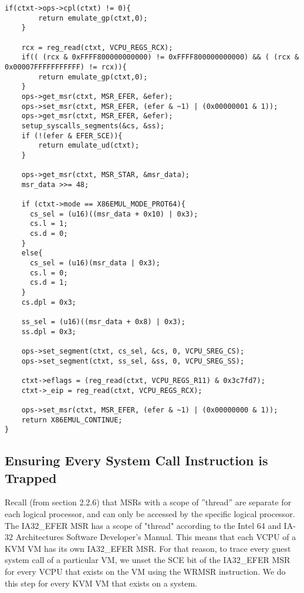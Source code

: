 \documentclass{report}
\begin{document}
\begin{spacing}{1.5}
\begin{lstlisting}[caption={Emulation of SYSRET instruction},captionpos=b]
    if(ctxt->ops->cpl(ctxt) != 0){
        return emulate_gp(ctxt,0);
    }
    
    rcx = reg_read(ctxt, VCPU_REGS_RCX);
    if(( (rcx & 0xFFFF800000000000) != 0xFFFF800000000000) && ( (rcx & 0x00007FFFFFFFFFFF) != rcx)){
        return emulate_gp(ctxt,0);
    }
    ops->get_msr(ctxt, MSR_EFER, &efer);
    ops->set_msr(ctxt, MSR_EFER, (efer & ~1) | (0x00000001 & 1));
    ops->get_msr(ctxt, MSR_EFER, &efer);
    setup_syscalls_segments(&cs, &ss);
    if (!(efer & EFER_SCE)){
        return emulate_ud(ctxt);
    }

    ops->get_msr(ctxt, MSR_STAR, &msr_data);
    msr_data >>= 48;
    
    if (ctxt->mode == X86EMUL_MODE_PROT64){
      cs_sel = (u16)((msr_data + 0x10) | 0x3);
      cs.l = 1;
      cs.d = 0;
    }
    else{
      cs_sel = (u16)(msr_data | 0x3);
      cs.l = 0;
      cs.d = 1;
    }
    cs.dpl = 0x3;
    
    ss_sel = (u16)((msr_data + 0x8) | 0x3);
    ss.dpl = 0x3;
    
    ops->set_segment(ctxt, cs_sel, &cs, 0, VCPU_SREG_CS);
    ops->set_segment(ctxt, ss_sel, &ss, 0, VCPU_SREG_SS);
    
    ctxt->eflags = (reg_read(ctxt, VCPU_REGS_R11) & 0x3c7fd7);
    ctxt->_eip = reg_read(ctxt, VCPU_REGS_RCX);
    
    ops->set_msr(ctxt, MSR_EFER, (efer & ~1) | (0x00000000 & 1));
    return X86EMUL_CONTINUE;
}
\end{lstlisting}


















\subsection{Ensuring Every System Call Instruction is Trapped}
{\large
Recall (from section 2.2.6) that MSRs with a scope of ”thread” are separate for each logical processor, and can only be accessed by the specific logical processor. The IA32\_EFER MSR has a scope of "thread" according to the Intel 64 and IA-32 Architectures Software Developer’s Manual. This means that each VCPU of a KVM VM has its own IA32\_EFER MSR. For that reason, to trace every guest system call of a particular VM, we unset the SCE bit of the IA32\_EFER MSR for every VCPU that exists on the VM using the WRMSR instruction. We do this step for every KVM VM that exists on a system.
\leavevmode\newline
}


\end{spacing}
\end{document}
